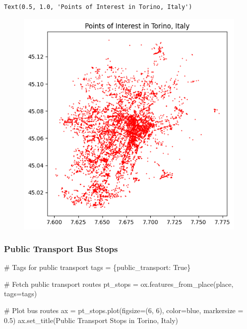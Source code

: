 \documentclass[
  letterpaper,
  DIV=11,
  numbers=noendperiod]{scrreprt}
\newenvironment{Shaded}{\begin{snugshade}}{\end{snugshade}}
\newcommand{\CommentTok}[1]{\textcolor[rgb]{0.37,0.37,0.37}{#1}}
\newcommand{\DecValTok}[1]{\textcolor[rgb]{0.68,0.00,0.00}{#1}}
\newcommand{\FloatTok}[1]{\textcolor[rgb]{0.68,0.00,0.00}{#1}}
\newcommand{\NormalTok}[1]{\textcolor[rgb]{0.00,0.23,0.31}{#1}}
\newcommand{\OperatorTok}[1]{\textcolor[rgb]{0.37,0.37,0.37}{#1}}
\newcommand{\StringTok}[1]{\textcolor[rgb]{0.13,0.47,0.30}{#1}}
\newcommand{\VariableTok}[1]{\textcolor[rgb]{0.07,0.07,0.07}{#1}}
\begin{document}
\begin{verbatim}
Text(0.5, 1.0, 'Points of Interest in Torino, Italy')
\end{verbatim}

\begin{figure}[H]

{\centering \includegraphics{labs/w07_OSM_files/figure-pdf/cell-45-output-2.png}

}

\end{figure}

\hypertarget{public-transport-bus-stops}{%
\subsubsection{Public Transport Bus
Stops}\label{public-transport-bus-stops}}

\begin{Shaded}
\begin{Highlighting}[]
\CommentTok{\# Tags for public transport}
\NormalTok{tags }\OperatorTok{=}\NormalTok{ \{}\StringTok{\textquotesingle{}public\_transport\textquotesingle{}}\NormalTok{: }\VariableTok{True}\NormalTok{\}}

\CommentTok{\# Fetch public transport routes}
\NormalTok{pt\_stops }\OperatorTok{=}\NormalTok{ ox.features\_from\_place(place, tags}\OperatorTok{=}\NormalTok{tags)}

\CommentTok{\# Plot bus routes}
\NormalTok{ax }\OperatorTok{=}\NormalTok{ pt\_stops.plot(figsize}\OperatorTok{=}\NormalTok{(}\DecValTok{6}\NormalTok{, }\DecValTok{6}\NormalTok{), color}\OperatorTok{=}\StringTok{\textquotesingle{}blue\textquotesingle{}}\NormalTok{, markersize }\OperatorTok{=} \FloatTok{0.5}\NormalTok{)}
\NormalTok{ax.set\_title(}\StringTok{\textquotesingle{}Public Transport Stops in Torino, Italy\textquotesingle{}}\NormalTok{)}
\end{Highlighting}
\end{Shaded}
\end{document}

